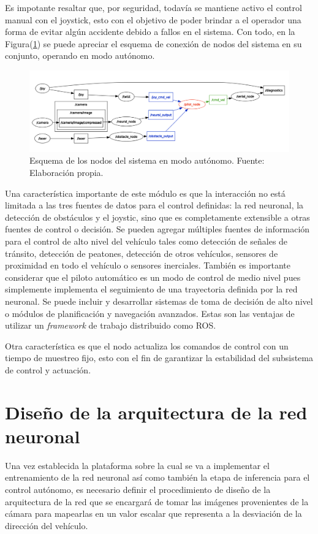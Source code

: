     Es impotante resaltar que, por seguridad, todavía se mantiene activo el control manual con el joystick, esto con el objetivo 
    de poder brindar a el operador una forma de evitar algún accidente debido a fallos en el sistema. Con todo, en la Figura(\ref{fig:nodesauto}) se 
    puede apreciar el esquema de conexión de nodos del sistema en su conjunto, operando en modo autónomo.

    \begin{figure}[!ht] 
        \centering
        \includegraphics[width=\textwidth]{img/nodesauto}
        \caption[Esquema de los nodos del sistema en modo autónomo]{Esquema de los nodos del sistema en modo autónomo. Fuente: Elaboración propia. }
        \label{fig:nodesauto}
    \end{figure}

    Una característica importante de este módulo es que la interacción no está limitada a las tres 
    fuentes de datos para el control definidas: la red neuronal, la detección de obstáculos y el joystic, sino que es completamente 
    extensible a otras fuentes de control o decisión. Se pueden agregar múltiples fuentes de información para el control de 
    alto nivel del vehículo tales como detección de señales de tránsito, detección de peatones, detección de otros vehículos, 
    sensores de proximidad en todo el vehículo o sensores inerciales. También es importante considerar que el piloto automático 
    es un modo de control de medio nivel pues simplemente implementa el seguimiento de una trayectoria definida por la red neuronal. Se puede incluir 
    y desarrollar sistemas de toma de decisión de alto nivel o módulos de planificación y navegación avanzados. Estas son las 
    ventajas de utilizar un \textit{framework} de trabajo distribuido como ROS. 

    Otra característica es que el nodo actualiza los comandos de control con un tiempo de muestreo fijo, esto con el fin de 
    garantizar la estabilidad del subsistema de control y actuación. 

\section{Diseño de la arquitectura de la red neuronal}\label{sec:design}
Una vez establecida la plataforma sobre la cual se va a implementar el entrenamiento de la red neuronal así como también la 
etapa de inferencia para el control autónomo, es necesario definir el procedimiento de diseño de la arquitectura de la red 
que se encargará de tomar las imágenes provenientes de la cámara para mapearlas en un valor escalar que representa a la 
desviación de la dirección del vehículo.


